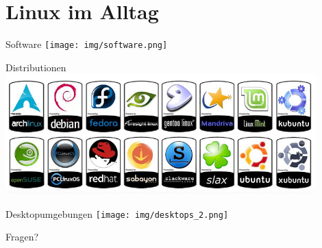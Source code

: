 \documentclass[10pt]{beamer}
\begin{document}
\section{Linux im Alltag}

\begin{frame}{Software}
    \centering
    \texttt{[image: img/software.png]}
\end{frame}

\begin{frame}{Distributionen}
    \centering
    \includegraphics[keepaspectratio,width=0.9\textwidth]{img/logos_2.png}
\end{frame}

\begin{frame}{Desktopumgebungen}
\centering
\texttt{[image: img/desktops\_2.png]}
\end{frame}

\begin{frame}[standout]
Fragen?
\end{frame}
\end{document}
